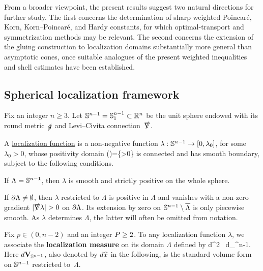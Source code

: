 \documentclass[11pt]{article}
\numberwithin{table}{section}
\numberwithin{equation}{section}
\numberwithin{table}{section}
\numberwithin{figure}{section}
\begin{document}
From a broader viewpoint, the present results suggest two natural directions for further study. The first concerns the determination of sharp weighted Poincar\'e, Korn, Korn--Poincar\'e, and Hardy constants, for which optimal-transport and symmetrization methods may be relevant. The second concerns the extension of the gluing construction to localization domains substantially more general than asymptotic cones, once suitable analogues of the present weighted inequalities and shell estimates have been established.


\subsection{Spherical localization framework}
\label{sectionN1-spherical}

Fix an integer $n\ge 3$. Let $\mathbb S^{n-1}=\mathbb S^{n-1}_1\subset\mathbb R^n$ be the unit sphere endowed with its round metric~$\slashed{g}{}$ and Levi--Civita connection~$\slashed\nabla{}$.

\begin{definition}\label{def:localization-function}
A \underline{localization function} is a non-negative function \(\lambda:\mathbb S^{n-1}\to[0,\lambda_0]\), for some \(\lambda_0>0\), whose positivity domain
\be
\Lambda\coloneqq{}(\lambda)=\{\lambda>0\}
\ee
is connected and has smooth boundary, subject to the following conditions. 
\bei

\item If \(\Lambda=\mathbb S^{n-1}\), then \(\lambda\) is smooth and strictly positive on the whole sphere.

\item If \(\partial\Lambda\neq\emptyset\), then \(\lambda\) restricted to $\overline\Lambda$ is positive in \(\Lambda\) and vanishes with a non-zero gradient \(|\nablaslash\lambda|>0\) on \(\partial\Lambda\).  Its extension by zero on \(\mathbb S^{n-1}\setminus\overline\Lambda\) is only piecewise smooth.
\eei
\noindent As \(\lambda\) determines \(\Lambda\), the latter will often be omitted from notation.
\end{definition}


Fix $p\in(0,n- 2)$ and an integer $P\ge 2$. To any localization function $\lambda$, we associate the \textbf{localization measure} on its domain $\Lambda$ defined by 
d\chi \coloneqq \lambda^{2\expoP} \, d\Vol_{\Sbb^{n-1}}.
\ee
Here $d\textnormal{\textbf{V}}_{\mathbb S^{n-1}}$, also denoted by $d\widehat{x}$ in the following, is the standard volume form on $\mathbb S^{n-1}$ restricted to~$\Lambda$. 
\end{document}
